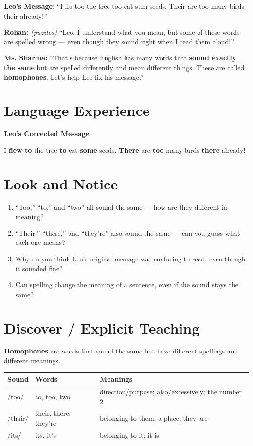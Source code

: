 \textbf{Leo's Message:} ``I flu too the tree too eat sum seeds. Their are too many birds their already!''

\textbf{Rohan:} \textit{(puzzled)} ``Leo, I understand what you mean, but some of these words are spelled wrong --- even though they sound right when I read them aloud!''

\textbf{Ms. Sharma:} ``That's because English has many words that \textbf{sound exactly the same} but are spelled differently and mean different things. These are called \textbf{homophones}. Let's help Leo fix his message.''

\section{Language Experience}
\textbf{Leo's Corrected Message}

I \textbf{flew to} the tree \textbf{to} eat \textbf{some} seeds. \textbf{There} are \textbf{too} many birds \textbf{there} already!

\section{Look and Notice}
\begin{thinkbox}
\begin{enumerate}
    \item ``Too,'' ``to,'' and ``two'' all sound the same --- how are they different in meaning?
    \item ``Their,'' ``there,'' and ``they're'' also sound the same --- can you guess what each one means?
    \item Why do you think Leo's original message was confusing to read, even though it sounded fine?
    \item Can spelling change the meaning of a sentence, even if the sound stays the same?
\end{enumerate}
\end{thinkbox}

\section{Discover / Explicit Teaching}
\textbf{Homophones} are words that sound the same but have different spellings and different meanings.

\begin{table}[h!]
\centering
\begin{tabular}{|l|l|l|}
\hline
\textbf{Sound} & \textbf{Words} & \textbf{Meanings} \\
\hline
/too/ & to, too, two & direction/purpose; also/excessively; the number 2 \\
/thair/ & their, there, they're & belonging to them; a place; they are \\
/its/ & its, it's & belonging to it; it is \\
\hline
\end{tabular}
\end{table}

